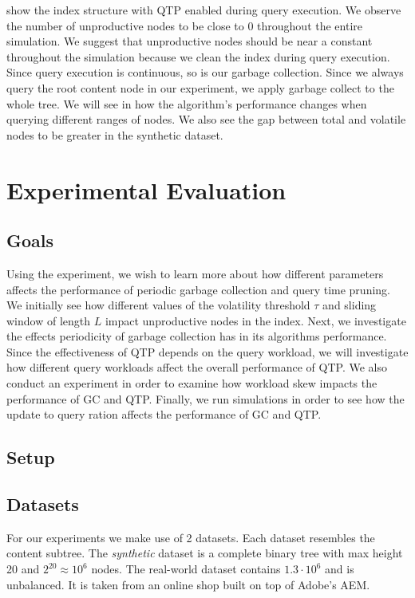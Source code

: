 \message{ !name(thesis.tex)}\documentclass[abstracton,12pt]{scrartcl}
\theoremstyle{definition}
\begin{document}
 show the index
structure with QTP enabled during query execution. We observe the number of
unproductive nodes to be close to 0 throughout the entire simulation. We suggest
that unproductive nodes should be near a constant throughout the simulation
because we clean the index during query execution. Since query execution is
continuous, so is our garbage collection. Since we always query the root content
node in our experiment, we apply garbage collect to the whole tree. We will see
in  how the algorithm's performance changes when
querying different ranges of nodes. We also see the gap between total and
volatile nodes to be greater in the synthetic dataset.

\newpage

\section{Experimental Evaluation}
\label{sec:experimental-evaluation}

\subsection{Goals}

Using the experiment, we wish to learn more about how different parameters
affects the performance of periodic garbage collection and query time pruning.
We initially see how different values of the volatility threshold $\tau$
and sliding window of length $L$ impact unproductive nodes in the index. Next,
we investigate the effects periodicity of garbage collection has in its
algorithms performance. Since the effectiveness of QTP depends on the query
workload, we will investigate how different query workloads affect the overall
performance of QTP. We also conduct an experiment in order to examine how
workload skew impacts the performance of GC and QTP. Finally, we run simulations
in order to see how the update to query ration affects the performance of GC and QTP.

\subsection{Setup}

\subsection{Datasets}

For our experiments we make use of 2 datasets. Each dataset resembles the
content subtree. The \textit{synthetic} dataset is a complete binary tree with
max height 20 and $2^20 \approx 10^6$ nodes. The real-world dataset contains
$1.3 \cdot 10^6$ and is unbalanced. It is taken from an online shop built on top
of Adobe's AEM.
\end{document}
